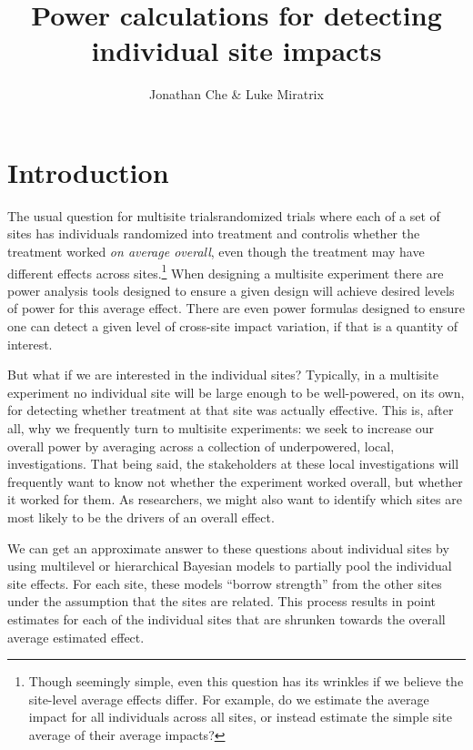 \documentclass[]{article}
\title{Power calculations for detecting \\ individual site impacts}
\author{Jonathan Che \& Luke Miratrix}
\begin{document}
\maketitle



\section{Introduction}

The usual question for multisite trials\textemdash randomized trials where each of a set of sites has individuals randomized into treatment and control\textemdash is whether the treatment worked \emph{on average overall}, even though the treatment may have different effects across sites.\footnote{Though seemingly simple, even this question has its wrinkles if we believe the site-level average effects differ.
For example, do we estimate the average impact for all individuals across all sites, or instead estimate the simple site average of their average impacts?}
When designing a multisite experiment there are power analysis tools designed to ensure a given design will achieve desired levels of power for this average effect.
There are even power formulas designed to ensure one can detect a given level of cross-site impact variation, if that is a quantity of interest.

But what if we are interested in the individual sites?
Typically, in a multisite experiment no individual site will be large enough to be well-powered, on its own, for detecting whether treatment at that site was actually effective.
This is, after all, why we frequently turn to multisite experiments: we seek to increase our overall power by averaging across a collection of underpowered, local, investigations.
That being said, the stakeholders at these local investigations will frequently want to know not whether the experiment worked overall, but whether it worked for them.
As researchers, we might also want to identify which sites are most likely to be the drivers of an overall effect.

We can get an approximate answer to these questions about individual sites by using multilevel or hierarchical Bayesian models to partially pool the individual site effects.
For each site, these models ``borrow strength'' from the other sites under the assumption that the sites are related.
This process results in point estimates for each of the individual sites that are shrunken towards the overall average estimated effect.
\end{document}

